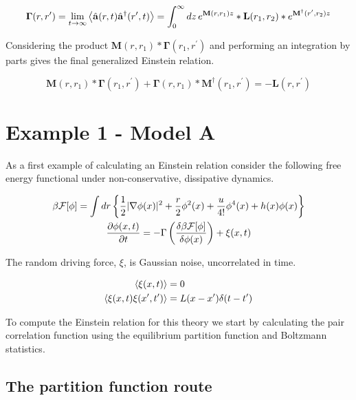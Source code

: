 \begin{equation} \mathbf{\Gamma}(r, r^\prime) = \lim_{t\rightarrow\infty}
\left\langle \hat{\mathbf{a}}(r, t)\hat{\mathbf{a}}^\dagger(r^\prime, t) \right\rangle
= \int_0^\infty dz \,e^{\mathbf{M}(r, r_1)z}\ast\mathbf{L}(r_1, r_2)\ast
e^{\mathbf{M}^\dagger(r^\prime, r_2)z} \end{equation}

Considering the product $\mathbf{M}(r, r_1)\ast\mathbf{\Gamma}(r_1, r^\prime)$
and performing an integration by parts gives the final generalized Einstein
relation.

\begin{equation} \mathbf{M}(r, r_1)\ast\mathbf{\Gamma}(r_1, r^\prime) +
\mathbf{\Gamma}(r, r_1)\ast\mathbf{M}^\dagger(r_1, r^\prime) = -\mathbf{L}(r,
r^\prime) \end{equation}

\section{Example 1 - Model A}

As a first example of calculating an Einstein relation consider the following
free energy functional under non-conservative, dissipative dynamics.

\begin{gather} \beta \mathcal{F}[\phi] = \int dr \left\lbrace \frac{1}{2}\vert \nabla
    \phi(x) \vert^2 + \frac{r}{2}\phi^2(x) + \frac{u}{4!}\phi^4(x)  +
    h(x)\phi(x)\right\rbrace \\ \frac{\partial \phi(x,t)}{\partial t} = -\Gamma
    \left(\frac{\delta \beta \mathcal{F}[\phi]}{\delta \phi(x)}\right) + \xi(x, t)
\end{gather}

The random driving force, $\xi$, is Gaussian noise, uncorrelated in time.

\begin{align} \left\langle \xi (x, t) \right\rangle &= 0 \\ \left\langle \xi (x, t)
\xi(x^\prime, t^\prime) \right\rangle  &= L(x-x^\prime) \delta (t - t^\prime)
\end{align}

To compute the Einstein relation for this theory we start by calculating the
pair correlation function using the equilibrium partition function and
Boltzmann statistics.

\subsection{The partition function route}

